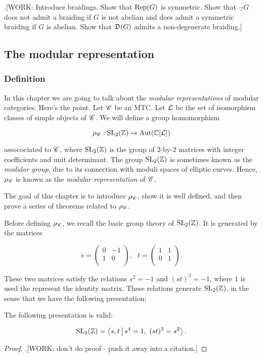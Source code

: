.[WORK: Introduce braidings. Show that $\operatorname{Rep}(G)$ is symmetric. Show that $\Vec_G$ does not admit a braiding if $G$ is not abelian and does admit a symmetric braiding if $G$ is abelian. Show that $\mathfrak{D}(G)$ admits a non-degenerate braiding.]


\subsection{The modular representation}

\subsubsection{Definition}

In this chapter we are going to talk about the \textit{modular representations} of modular categories. Here's the point. Let $\mathscr{C}$ be an MTC. Let $\mathcal{L}$ be the set of isomorphism classes of simple objects of $\mathscr{C}$. We will define a group homomorphism

$$\rho_{\mathscr{C}}:\operatorname{SL}_2(\mathbb{Z})\xrightarrow{}\operatorname{Aut}(\mathbb{C}[\mathcal{L}])$$

assocociated to $\mathscr{C}$, where $\operatorname{SL}_2(\mathbb{Z})$ is the group of $2$-by-$2$ matrices with integer coefficients and unit determinant. The group $\operatorname{SL}_2(\mathbb{Z})$ is sometimes known as the \textit{modular group}, due to its connection with moduli spaces of elliptic curves. Hence, $\rho_{\mathscr{C}}$ is known as the \textit{modular representation} of $\mathscr{C}$.

The goal of this chapter is to introduce $\rho_{\mathscr{C}}$, show it is well defined, and then prove a series of theorems related to $\rho_{\mathscr{C}}$.

Before defining $\rho_{\mathscr{C}}$, we recall the basic group theory of $\operatorname{SL}_2(\mathbb{Z})$. It is generated by the matrices

$$
s=
\begin{pmatrix}
0 & -1 \\
1 & 0 \\
\end{pmatrix},
\,\,\,\,
t=
\begin{pmatrix}
1 & 1 \\
0 & 1 \\
\end{pmatrix}.
$$

These two matrices satisfy the relations $s^2=-1$ and $(st)^3=-1$, where $1$ is used the represent the identity matrix. These relations generate $\operatorname{SL}_2(\mathbb{Z})$, in the sense that we have the following presentation:

\begin{proposition} The following presentation is valid:

$$\operatorname{SL}_2(\mathbb{Z})=\Braket{s,t | s^4=1,\,\, (st)^3=s^2}.$$
\end{proposition}
\begin{proof}.[WORK: don't do proof - push it away into a citation.]
\end{proof}

